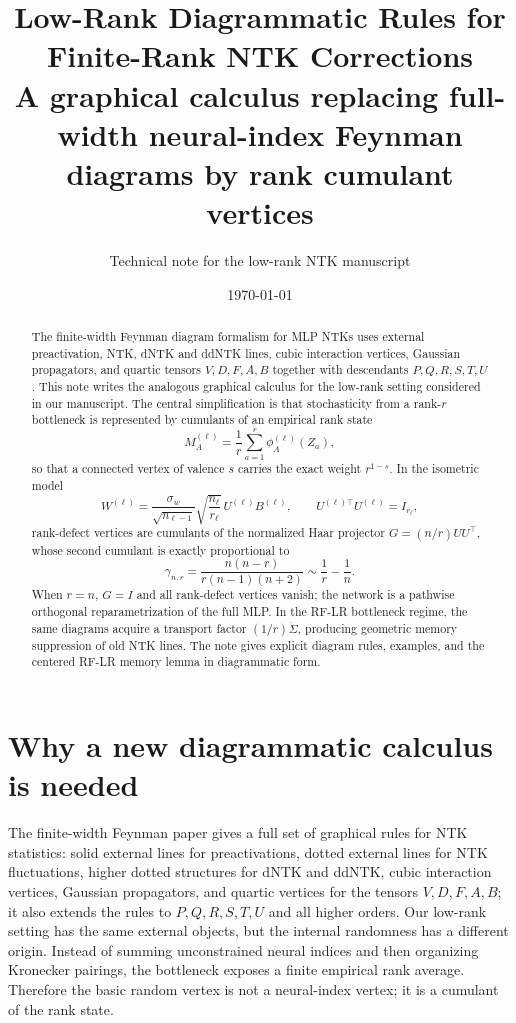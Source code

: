 \documentclass[11pt]{article}
\title{Low-Rank Diagrammatic Rules for Finite-Rank NTK Corrections\\
\large A graphical calculus replacing full-width neural-index Feynman diagrams by rank cumulant vertices}
\author{Technical note for the low-rank NTK manuscript}
\date{\today}
\begin{document}
\maketitle

\begin{abstract}
The finite-width Feynman diagram formalism for MLP NTKs uses external preactivation, NTK, dNTK and ddNTK lines, cubic interaction vertices, Gaussian propagators, and quartic tensors $V,D,F,A,B$ together with descendants $P,Q,R,S,T,U$.  This note writes the analogous graphical calculus for the low-rank setting considered in our manuscript.  The central simplification is that stochasticity from a rank-$r$ bottleneck is represented by cumulants of an empirical rank state
\[
M_A^{(\ell)}=\frac1r\sum_{a=1}^r\phi_A^{(\ell)}(Z_a),
\]
so that a connected vertex of valence $s$ carries the exact weight $r^{1-s}$.  In the isometric model
\[
W^{(\ell)}=\frac{\sigma_w}{\sqrt{n_{\ell-1}}}\sqrt{\frac{n_\ell}{r_\ell}}\,U^{(\ell)}B^{(\ell)},\qquad U^{(\ell)\top}U^{(\ell)}=I_{r_\ell},
\]
rank-defect vertices are cumulants of the normalized Haar projector $G=(n/r)UU^\top$, whose second cumulant is exactly proportional to
\[
\gamma_{n,r}=\frac{n(n-r)}{r(n-1)(n+2)}\sim \frac1r-\frac1n.
\]
When $r=n$, $G=I$ and all rank-defect vertices vanish; the network is a pathwise orthogonal reparametrization of the full MLP.  In the RF-LR bottleneck regime, the same diagrams acquire a transport factor $(1/r)\dot\Sigma$, producing geometric memory suppression of old NTK lines.  The note gives explicit diagram rules, examples, and the centered RF-LR memory lemma in diagrammatic form.
\end{abstract}

\tableofcontents

\section{Why a new diagrammatic calculus is needed}

The finite-width Feynman paper gives a full set of graphical rules for NTK statistics: solid external lines for preactivations, dotted external lines for NTK fluctuations, higher dotted structures for dNTK and ddNTK, cubic interaction vertices, Gaussian propagators, and quartic vertices for the tensors $V,D,F,A,B$; it also extends the rules to $P,Q,R,S,T,U$ and all higher orders.  Our low-rank setting has the same external objects, but the internal randomness has a different origin.  Instead of summing unconstrained neural indices and then organizing Kronecker pairings, the bottleneck exposes a finite empirical rank average.  Therefore the basic random vertex is not a neural-index vertex; it is a cumulant of the rank state.
\end{document}
